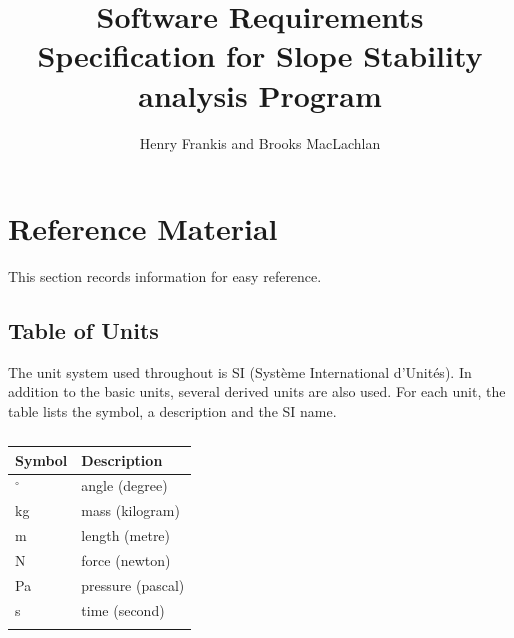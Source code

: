 \documentclass[12pt]{article}
\title{Software Requirements Specification for Slope Stability analysis Program}
\author{Henry Frankis and Brooks MacLachlan}
\begin{document}
\maketitle
\tableofcontents
\newpage
\section{Reference Material}
\label{Sec:RefMat}
This section records information for easy reference.
\subsection{Table of Units}
\label{Sec:ToU}
The unit system used throughout is SI (Système International d'Unités). In addition to the basic units, several derived units are also used. For each unit, the table lists the symbol, a description and the SI name.
\begin{longtable}{l l}
\toprule
Symbol & Description
\\
\midrule
\endhead
${}^{\circ}$ & angle (degree)
\\
kg & mass (kilogram)
\\
m & length (metre)
\\
N & force (newton)
\\
Pa & pressure (pascal)
\\
s & time (second)
\\
\bottomrule
\caption{}
\label{Table:ToU}
\end{longtable}
\end{document}

